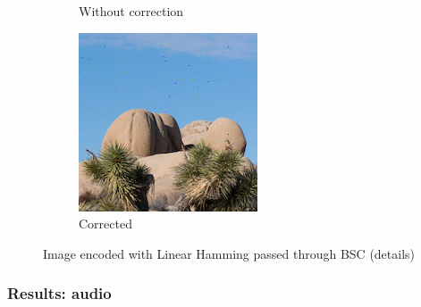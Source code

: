 \documentclass{article}
\begin{document}
\begin{figure}[htb]
\begin{subfigure}[b]{0.32\textwidth}
        \caption{Without correction}
        \label{fig:cropped-image-linear-bsc-no-correction}
    \end{subfigure}
    \hfill
    \begin{subfigure}[b]{0.32\textwidth}
        \centering
        \includegraphics[width=\textwidth]{../Result/Linear/cropped-linear-bsc-output-syndrome-corrected.png}
        \caption{Corrected}
        \label{fig:cropped-image-linear-bsc-syndrome-corrected}
    \end{subfigure}
       \caption{Image encoded with Linear Hamming passed through BSC (details)}
       \label{fig:cropped-image-linear-bsc}
\end{figure}


\subsubsection{Results: audio}
\end{document}
